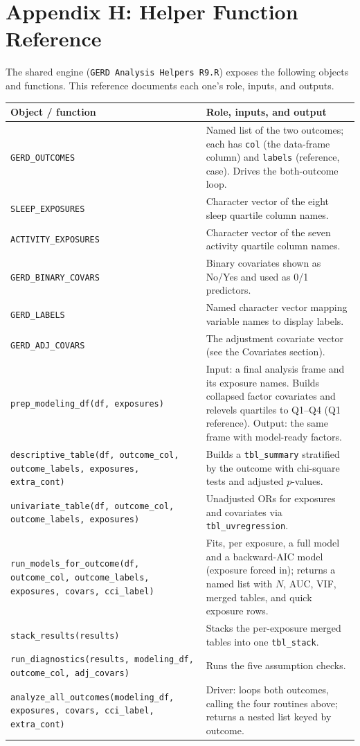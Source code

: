 \documentclass[11pt]{article}
\newcommand{\code}[1]{\texttt{\small #1}}
\begin{document}
\section{Appendix H: Helper Function Reference}
The shared engine (\code{GERD Analysis Helpers R9.R}) exposes the following objects and functions. This
reference documents each one's role, inputs, and outputs.

\begin{longtable}{@{}p{4.9cm}p{8.6cm}@{}}
\toprule
\textbf{Object / function} & \textbf{Role, inputs, and output} \\
\midrule
\endhead
\code{GERD_OUTCOMES} & Named list of the two outcomes; each has \code{col} (the data-frame column) and
\code{labels} (reference, case). Drives the both-outcome loop. \\
\code{SLEEP_EXPOSURES} & Character vector of the eight sleep quartile column names. \\
\code{ACTIVITY_EXPOSURES} & Character vector of the seven activity quartile column names. \\
\code{GERD_BINARY_COVARS} & Binary covariates shown as No/Yes and used as 0/1 predictors. \\
\code{GERD_LABELS} & Named character vector mapping variable names to display labels. \\
\code{GERD_ADJ_COVARS} & The adjustment covariate vector (see the Covariates section). \\
\code{prep_modeling_df(df, exposures)} & Input: a final analysis frame and its exposure names. Builds
collapsed factor covariates and relevels quartiles to Q1--Q4 (Q1 reference). Output: the same frame with
model-ready factors. \\
\code{descriptive_table(df, outcome_col, outcome_labels, exposures, extra_cont)} & Builds a
\code{tbl_summary} stratified by the outcome with chi-square tests and adjusted $p$-values. \\
\code{univariate_table(df, outcome_col, outcome_labels, exposures)} & Unadjusted ORs for exposures and
covariates via \code{tbl_uvregression}. \\
\code{run_models_for_outcome(df, outcome_col, outcome_labels, exposures, covars, cci_label)} & Fits, per
exposure, a full model and a backward-AIC model (exposure forced in); returns a named list with $N$, AUC,
VIF, merged tables, and quick exposure rows. \\
\code{stack_results(results)} & Stacks the per-exposure merged tables into one \code{tbl_stack}. \\
\code{run_diagnostics(results, modeling_df, outcome_col, adj_covars)} & Runs the five assumption checks. \\
\code{analyze_all_outcomes(modeling_df, exposures, covars, cci_label, extra_cont)} & Driver: loops both
outcomes, calling the four routines above; returns a nested list keyed by outcome. \\
\bottomrule
\end{longtable}
\end{document}
